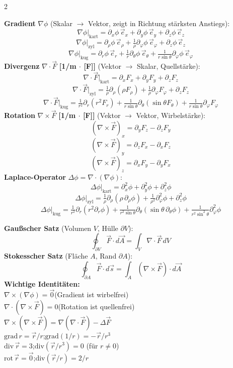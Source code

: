 \documentclass[a4paper, 7.5pt]{extarticle}
\newcommand{\unitbox}[1]{\textnormal{\small\textcolor{boxtitle}{\textbf{[#1]}}}}
\begin{document}
\begin{multicols*}{2}
\begin{tcolorbox}[title={Differentialoperatoren -- alle Koordinatensysteme}]
\textbf{Gradient} $\nabla\phi$ \;\text{\textcolor{boxtitle}{[\(V/m\)]}} \quad(Skalar $\to$ Vektor, zeigt in Richtung stärksten Anstiegs):
$$\nabla\phi\big|_{\text{kart}} = \partial_x\phi\,\vec{e}_x + \partial_y\phi\,\vec{e}_y + \partial_z\phi\,\vec{e}_z$$
$$\nabla\phi\big|_{\text{zyl}} = \partial_\rho\phi\,\vec{e}_\rho + \tfrac{1}{\rho}\partial_\varphi\phi\,\vec{e}_\varphi + \partial_z\phi\,\vec{e}_z$$
$$\nabla\phi\big|_{\text{kug}} = \partial_r\phi\,\vec{e}_r + \tfrac{1}{r}\partial_\theta\phi\,\vec{e}_\theta + \tfrac{1}{r\sin\theta}\partial_\varphi\phi\,\vec{e}_\varphi$$
\textbf{Divergenz} $\nabla\cdot\vec{F}$ \unitbox{1/m $\cdot$ [F]} \quad(Vektor $\to$ Skalar, Quellstärke):
$$\nabla\cdot\vec{F}\big|_{\text{kart}} = \partial_x F_x + \partial_y F_y + \partial_z F_z$$
$$\nabla\cdot\vec{F}\big|_{\text{zyl}} = \tfrac{1}{\rho}\partial_\rho(\rho F_\rho) + \tfrac{1}{\rho}\partial_\varphi F_\varphi + \partial_z F_z$$
$$\nabla\cdot\vec{F}\big|_{\text{kug}} = \tfrac{1}{r^2}\partial_r(r^2 F_r) + \tfrac{1}{r\sin\theta}\partial_\theta(\sin\theta F_\theta) + \tfrac{1}{r\sin\theta}\partial_\varphi F_\varphi$$
\textbf{Rotation} $\nabla\times\vec{F}$ \unitbox{1/m $\cdot$ [F]} \quad(Vektor $\to$ Vektor, Wirbelstärke):
$$(\nabla\times\vec{F})_x = \partial_y F_z - \partial_z F_y$$
$$(\nabla\times\vec{F})_y = \partial_z F_x - \partial_x F_z$$
$$(\nabla\times\vec{F})_z = \partial_x F_y - \partial_y F_x$$
\textbf{Laplace-Operator} $\Delta\phi = \nabla\cdot(\nabla\phi)$:
$$\Delta\phi\big|_{\text{kart}} = \partial_x^2\phi + \partial_y^2\phi + \partial_z^2\phi$$
$$\Delta\phi\big|_{\text{zyl}} = \tfrac{1}{\rho}\partial_\rho(\rho\,\partial_\rho\phi) + \tfrac{1}{\rho^2}\partial_\varphi^2\phi + \partial_z^2\phi$$
$$\Delta\phi\big|_{\text{kug}} = \tfrac{1}{r^2}\partial_r(r^2\partial_r\phi) + \tfrac{1}{r^2\sin\theta}\partial_\theta(\sin\theta\,\partial_\theta\phi) + \tfrac{1}{r^2\sin^2\theta}\partial_\varphi^2\phi$$
\end{tcolorbox}

\begin{tcolorbox}[title={Integralsätze \& Vektoridentitäten}]
\textbf{Gaußscher Satz} (Volumen $V$, Hülle $\partial V$):
$$\oint_{\partial V}\vec{F}\cdot d\vec{A} = \int_V \nabla\cdot\vec{F}\,dV$$
\textbf{Stokesscher Satz} (Fläche $A$, Rand $\partial A$):
$$\oint_{\partial A}\vec{F}\cdot d\vec{s} = \int_A (\nabla\times\vec{F})\cdot d\vec{A}$$
\textbf{Wichtige Identitäten:}\\
$\nabla\times(\nabla\phi) = \vec{0}$\quad(Gradient ist wirbelfrei)\\
$\nabla\cdot(\nabla\times\vec{F}) = 0$\quad(Rotation ist quellenfrei)\\
$\nabla\times(\nabla\times\vec{F}) = \nabla(\nabla\cdot\vec{F}) - \Delta\vec{F}$\\
$\text{grad}\,r = \vec{r}/r$;\quad $\text{grad}(1/r) = -\vec{r}/r^3$\\
$\text{div}\,\vec{r} = 3$;\quad $\text{div}(\vec{r}/r^3) = 0$ (für $r\neq0$)\\
$\text{rot}\,\vec{r} = \vec{0}$;\quad $\text{div}(\vec{r}/r) = 2/r$
\end{tcolorbox}


\end{multicols*}
\end{document}
